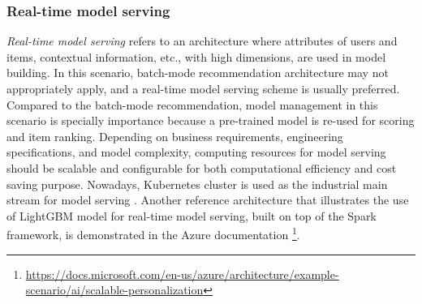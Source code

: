 \subsubsection{Real-time model serving}
\textit{Real-time model serving} refers to an architecture where attributes of users and items, contextual information, etc., with high dimensions, are used in model building. In this scenario, batch-mode recommendation architecture may not appropriately apply, and a real-time model serving scheme is usually preferred. Compared to the batch-mode recommendation, model management in this scenario is specially importance because a pre-trained model is re-used for scoring and item ranking. Depending on business requirements, engineering specifications, and model complexity, computing resources for model serving should be scalable and configurable for both computational efficiency and cost saving purpose. Nowadays, Kubernetes cluster is used as the industrial main stream for model serving \cite{bernstein2014containers}. Another reference architecture that illustrates the use of LightGBM model \cite{ke2017lightgbm} for real-time model serving, built on top of the Spark framework, is demonstrated in the Azure documentation \footnote{\url{https://docs.microsoft.com/en-us/azure/architecture/example-scenario/ai/scalable-personalization}}.

